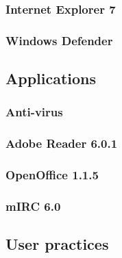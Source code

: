 \subsubsection{Internet Explorer 7}



\subsubsection{Windows Defender}

\subsection{Applications}

\subsubsection{Anti-virus}

\subsubsection{Adobe Reader 6.0.1}

\subsubsection{OpenOffice 1.1.5}

\subsubsection{mIRC 6.0}

\subsection{User practices}